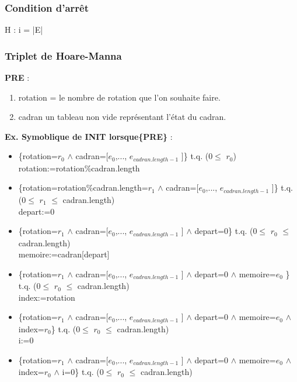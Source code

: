 \documentclass[a4paper, 12pt]{article}
\begin{document}
\subsubsection*{Condition d'arrêt}

H : i = |E|

\subsubsection{Triplet de Hoare-Manna}

\textbf{PRE} :
\begin{enumerate}
 \item rotation = le nombre de rotation que l'on souhaite faire. 
 \item cadran un tableau non vide représentant l'état du cadran.
\end{enumerate}

\vspace{0.2cm}

\textbf{Ex. Symoblique de INIT lorsque\{PRE\}} :

\begin{itemize}
\item \{rotation=$r_{0}$ $\wedge$ cadran=[$e_{0}$,..., $e_{cadran.length-1}$ ]\} t.q. (0$\le$ $r_{0}$)\\

rotation:=rotation\%cadran.length\\

\item \{rotation=rotation\%cadran.length=$r_{1}$ $\wedge$ cadran=[$e_{0}$,..., $e_{cadran.length-1}$ ]\} t.q. (0$\le$ $r_{1}$ $\le$ cadran.length)\\ 

depart:=0\\

\item \{rotation=$r_{1}$ $\wedge$ cadran=[$e_{0}$,..., $e_{cadran.length-1}$ ] $\wedge$ depart=0\} t.q. (0$\le$ $r_{0}$ $\le$ cadran.length)\\

memoire:=cadran[depart]\\

\item \{rotation=$r_{1}$ $\wedge$ cadran=[$e_{0}$,..., $e_{cadran.length-1}$ ] $\wedge$ depart=0 $\wedge$ memoire=$e_{0}$ \} t.q. (0$\le$ $r_{0}$ $\le$ cadran.length)\\

index:=rotation

\item \{rotation=$r_{1}$ $\wedge$ cadran=[$e_{0}$,..., $e_{cadran.length-1}$ ] $\wedge$ depart=0 $\wedge$ memoire=$e_{0}$ $\wedge$ index=$r_{0}$\} t.q. (0$\le$ $r_{0}$ $\le$ cadran.length)\\

i:=0\\

\item \{rotation=$r_{1}$ $\wedge$ cadran=[$e_{0}$,..., $e_{cadran.length-1}$ ] $\wedge$ depart=0 $\wedge$ memoire=$e_{0}$ $\wedge$ index=$r_{0}$ $\wedge$ i=0\} t.q. (0$\le$ $r_{0}$ $\le$ cadran.length)\\
\end{itemize}
\end{document}

